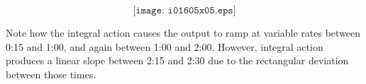 $$\texttt{[image: i01605x05.eps]}$$

Note how the integral action causes the output to ramp at variable rates between 0:15 and 1:00, and again between 1:00 and 2:00.  However, integral action produces a linear slope between 2:15 and 2:30 due to the rectangular deviation between those times.











